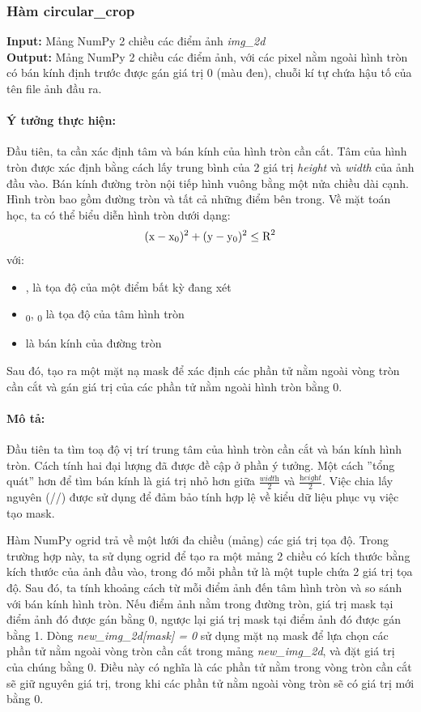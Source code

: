 \documentclass{article}
\begin{document}
\subsubsection{Hàm circular\_crop}
\textbf{Input:} Mảng NumPy 2 chiều các điểm ảnh \textit{img\_2d} \\
\textbf{Output:} Mảng NumPy 2 chiều các điểm ảnh, với các pixel nằm ngoài hình tròn có bán kính định trước được gán giá trị 0 (màu đen), chuỗi kí tự chứa hậu tố của tên file ảnh đầu ra.
\paragraph{Ý tưởng thực hiện:} Đầu tiên, ta cần xác định tâm và bán kính của hình tròn cần cắt. Tâm của hình tròn được xác định bằng cách lấy trung bình của 2 giá trị \textit{height} và \textit{width} của ảnh đầu vào. Bán kính đường tròn nội tiếp hình vuông bằng một nửa chiều dài cạnh. Hình tròn bao gồm đường tròn và tất cả những điểm bên trong. Về mặt toán học, ta có thể biểu diễn hình tròn dưới dạng:
\[ (\text{x} - \text{x}\textsubscript 0)^2 + (\text{y} - \text{y}\textsubscript 0)^2 \leq \text{R}^2\]
với: 
\begin{itemize}
  \item {},  là tọa độ của một điểm bất kỳ đang xét
  \item {}\textsubscript 0, \textsubscript 0 là tọa độ của tâm hình tròn
  \item {} là bán kính của đường tròn
\end{itemize}
Sau đó, tạo ra một mặt nạ mask để xác định các phần tử nằm ngoài vòng tròn cần cắt và gán giá trị của các phần tử nằm ngoài hình tròn bằng 0.
\paragraph{Mô tả:} Đầu tiên ta tìm toạ độ vị trí trung tâm của hình tròn cần cắt và bán kính hình tròn. Cách tính hai đại lượng đã được đề cập ở phần ý tưởng. Một cách ''tổng quát'' hơn để tìm bán kính là giá trị nhỏ hơn giữa $\frac{\textit{width}}{2}$ và $\frac{\textit{height}}{2}$. Việc chia lấy nguyên (//) được sử dụng để đảm bảo tính hợp lệ về kiểu dữ liệu phục vụ việc tạo mask.

Hàm NumPy ogrid trả về một lưới đa chiều (mảng) các giá trị tọa độ. Trong trường hợp này, ta sử dụng ogrid để tạo ra một mảng 2 chiều có kích thước bằng kích thước của ảnh đầu vào, trong đó mỗi phần tử là một tuple chứa 2 giá trị tọa độ. Sau đó, ta tính khoảng cách từ mỗi điểm ảnh đến tâm hình tròn và so sánh với bán kính hình tròn. Nếu điểm ảnh nằm trong đường tròn, giá trị mask tại điểm ảnh đó được gán bằng 0, ngược lại giá trị mask tại điểm ảnh đó được gán bằng 1. Dòng \textit{new\_img\_2d[mask] = 0} sử dụng mặt nạ mask để lựa chọn các phần tử nằm ngoài vòng tròn cần cắt trong mảng \textit{new\_img\_2d}, và đặt giá trị của chúng bằng 0. Điều này có nghĩa là các phần tử nằm trong vòng tròn cần cắt sẽ giữ nguyên giá trị, trong khi các phần tử nằm ngoài vòng tròn sẽ có giá trị mới bằng 0.
\end{document}
